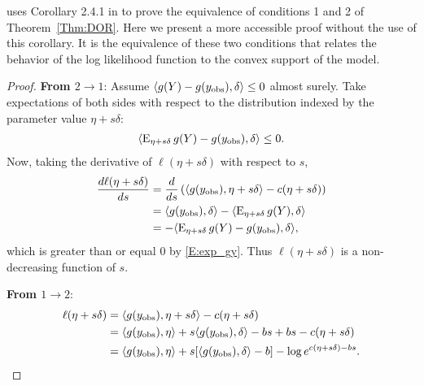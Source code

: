 \citeauthor{Geyer:gdor} uses Corollary 2.4.1 in \citet{Geyer:1990} to prove the 
equivalence of conditions 1 and 2 of Theorem~\ref{Thm:DOR}.  Here we present
a more accessible proof without the use of this corollary.  It is the equivalence
of these two conditions that relates the behavior of the log likelihood function
to the convex support of the model.
\begin{proof}
\textbf{From $2 \to 1$}:
Assume $\langle g(Y)-g(y_{\text{obs}}), \delta \rangle \leq 0$ almost surely.  Take expectations of both sides
with respect to the distribution indexed by the parameter value $\eta + s \delta$:
\begin{align} \label{E:exp_gy}
\langle  \operatorname{E}_{\eta + s \delta} g(Y) - g(y_{\text{obs}}), \delta \rangle \leq 0.
\end{align}
Now, taking the derivative of $\ell( \eta + s\delta)$ with respect to $s$,
\begin{align*}
\frac{d \ell( \eta + s \delta)}{d s} &= \frac{d }{d s} 
			\left ( \langle g(y_{\text{obs}}), \eta+s \delta \rangle - c(\eta+s\delta)  \right )\\
	&= \langle g(y_{\text{obs}}), \delta \rangle - \langle  \operatorname{E}_{\eta+s\delta}g(Y),\delta  \rangle\\
	&= - \langle  \operatorname{E}_{\eta+s\delta}g(Y) - g(y_{\text{obs}}),\delta  \rangle,
\end{align*}
which is greater than or equal 0 by \eqref{E:exp_gy}.
Thus $\ell(\eta+s\delta)$ is a non-decreasing function of $s$.

\textbf{From $1 \to 2$}:
\begin{align}
	\ell( \eta+s\delta) &= \langle g(y_{\text{obs}}), \eta+s\delta \rangle - c(\eta+s\delta) \notag \\ 
	&= \langle g(y_{\text{obs}}), \eta \rangle + s \langle g(y_{\text{obs}}),\delta \rangle -bs +bs - c(\eta+s\delta) \notag \\ 
	&= \langle g(y_{\text{obs}}), \eta \rangle + s [\langle g(y_{\text{obs}}),\delta \rangle -b]  - \log e^{c(\eta+s\delta) -bs}. \label{E:expanded ell}
\end{align}


\end{proof}
